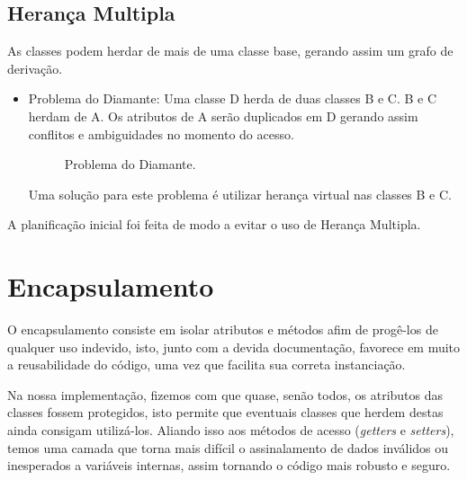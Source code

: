 \documentclass[rel_mlp]{iiufrgs}
\newcommand{\fonte}[1]{\\Fonte: {#1}}
\begin{document}
\subsection{Herança Multipla} 	
As classes podem herdar de mais de uma classe base, gerando assim um grafo de derivação.
 \begin{itemize}
   \item Problema do Diamante: Uma classe D herda de duas classes B e C. B e C herdam de A. Os atributos de A serão duplicados em D gerando   assim conflitos e ambiguidades no momento do acesso. 
\begin{figure}[htb]
    \centering
    \label{fig:figura3}
    \caption{Problema do Diamante.}
\end{figure}
   
   
   
   Uma solução para este problema  é utilizar herança virtual nas classes B e C.
 \end{itemize}  	
 A planificação inicial foi feita de modo a evitar o uso de Herança Multipla.
 
 
 
\section{Encapsulamento} 
 
	O encapsulamento consiste em isolar atributos e métodos afim de progê-los de qualquer uso indevido, isto, junto com a devida documentação, favorece em muito a reusabilidade do código, uma vez que facilita sua correta instanciação.
	
	Na nossa implementação, fizemos com que quase, senão todos, os atributos das classes fossem protegidos, isto permite que eventuais classes que herdem destas ainda consigam utilizá-los. Aliando isso aos métodos de acesso (\textit{getters} e \textit{setters}), temos uma camada que torna mais difícil o assinalamento de dados inválidos ou inesperados a variáveis internas, assim tornando o código mais robusto e seguro.
	
\end{document}

